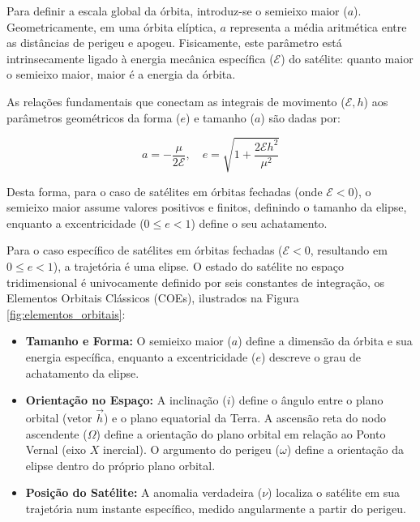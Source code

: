 Para definir a escala global da órbita, introduz-se o semieixo maior ($a$). Geometricamente, em uma órbita elíptica, $a$ representa a média aritmética entre as distâncias de perigeu e apogeu. Fisicamente, este parâmetro está intrinsecamente ligado à energia mecânica específica ($\mathcal{E}$) do satélite: quanto maior o semieixo maior, maior é a energia da órbita.

As relações fundamentais que conectam as integrais de movimento ($\mathcal{E}, h$) aos parâmetros geométricos da forma ($e$) e tamanho ($a$) são dadas por:

\begin{equation}
    a = -\frac{\mu}{2\mathcal{E}}, \quad e = \sqrt{1 + \frac{2\mathcal{E}h^2}{\mu^2}}
\end{equation}

Desta forma, para o caso de satélites em órbitas fechadas (onde $\mathcal{E} < 0$), o semieixo maior assume valores positivos e finitos, definindo o tamanho da elipse, enquanto a excentricidade ($0 \le e < 1$) define o seu achatamento.

Para o caso específico de satélites em órbitas fechadas ($\mathcal{E} < 0$, resultando em $0 \le e < 1$), a trajetória é uma elipse. O estado do satélite no espaço tridimensional é univocamente definido por seis constantes de integração, os Elementos Orbitais Clássicos (COEs), ilustrados na Figura \ref{fig:elementos_orbitais}:

\begin{itemize}
    \item \textbf{Tamanho e Forma:} O semieixo maior ($a$) define a dimensão da órbita e sua energia específica, enquanto a excentricidade ($e$) descreve o grau de achatamento da elipse.
    \item \textbf{Orientação no Espaço:} A inclinação ($i$) define o ângulo entre o plano orbital (vetor $\vec{h}$) e o plano equatorial da Terra. A ascensão reta do nodo ascendente ($\Omega$) define a orientação do plano orbital em relação ao Ponto Vernal (eixo $X$ inercial). O argumento do perigeu ($\omega$) define a orientação da elipse dentro do próprio plano orbital.
    \item \textbf{Posição do Satélite:} A anomalia verdadeira ($\nu$) localiza o satélite em sua trajetória num instante específico, medido angularmente a partir do perigeu.
\end{itemize}

